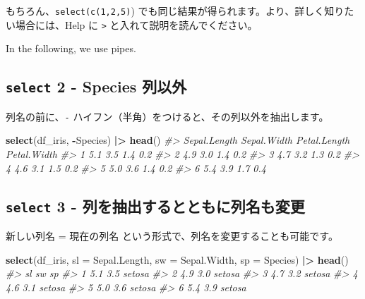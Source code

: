 \documentclass[
  xelatex, ja=standard]{bxjsbook}
\newenvironment{Shaded}{\begin{snugshade}}{\end{snugshade}}
\newcommand{\AttributeTok}[1]{\textcolor[rgb]{0.13,0.29,0.53}{#1}}
\newcommand{\CommentTok}[1]{\textcolor[rgb]{0.56,0.35,0.01}{\textit{#1}}}
\newcommand{\FunctionTok}[1]{\textcolor[rgb]{0.13,0.29,0.53}{\textbf{#1}}}
\newcommand{\NormalTok}[1]{#1}
\newcommand{\SpecialCharTok}[1]{\textcolor[rgb]{0.81,0.36,0.00}{\textbf{#1}}}
\theoremstyle{definition}
\theoremstyle{definition}
\theoremstyle{definition}
\theoremstyle{definition}
\theoremstyle{remark}
\begin{document}
もちろん、\texttt{select(c(1,2,5)}) でも同じ結果が得られます。より、詳しく知りたい場合には、Help に \texttt{\textbar{}\textgreater{}} と入れて説明を読んでください。

In the following, we use pipes.

\hypertarget{select-2---species-ux5217ux4ee5ux5916}{%
\subsection{\texorpdfstring{\texttt{select} 2 - Species 列以外}{select 2 - Species 列以外}}\label{select-2---species-ux5217ux4ee5ux5916}}

列名の前に、\texttt{-} ハイフン（半角）をつけると、その列以外を抽出します。

\begin{Shaded}
\begin{Highlighting}[]
\FunctionTok{select}\NormalTok{(df\_iris, }\SpecialCharTok{{-}}\NormalTok{Species) }\SpecialCharTok{|\textgreater{}} \FunctionTok{head}\NormalTok{()}
\CommentTok{\#\textgreater{}   Sepal.Length Sepal.Width Petal.Length Petal.Width}
\CommentTok{\#\textgreater{} 1          5.1         3.5          1.4         0.2}
\CommentTok{\#\textgreater{} 2          4.9         3.0          1.4         0.2}
\CommentTok{\#\textgreater{} 3          4.7         3.2          1.3         0.2}
\CommentTok{\#\textgreater{} 4          4.6         3.1          1.5         0.2}
\CommentTok{\#\textgreater{} 5          5.0         3.6          1.4         0.2}
\CommentTok{\#\textgreater{} 6          5.4         3.9          1.7         0.4}
\end{Highlighting}
\end{Shaded}

\hypertarget{select-3---ux5217ux3092ux62bdux51faux3059ux308bux3068ux3068ux3082ux306bux5217ux540dux3082ux5909ux66f4}{%
\subsection{\texorpdfstring{\texttt{select} 3 - 列を抽出するとともに列名も変更}{select 3 - 列を抽出するとともに列名も変更}}\label{select-3---ux5217ux3092ux62bdux51faux3059ux308bux3068ux3068ux3082ux306bux5217ux540dux3082ux5909ux66f4}}

新しい列名 = 現在の列名 という形式で、列名を変更することも可能です。

\begin{Shaded}
\begin{Highlighting}[]
\FunctionTok{select}\NormalTok{(df\_iris, }\AttributeTok{sl =}\NormalTok{ Sepal.Length, }\AttributeTok{sw =}\NormalTok{ Sepal.Width, }\AttributeTok{sp =}\NormalTok{ Species) }\SpecialCharTok{|\textgreater{}} 
  \FunctionTok{head}\NormalTok{()}
\CommentTok{\#\textgreater{}    sl  sw     sp}
\CommentTok{\#\textgreater{} 1 5.1 3.5 setosa}
\CommentTok{\#\textgreater{} 2 4.9 3.0 setosa}
\CommentTok{\#\textgreater{} 3 4.7 3.2 setosa}
\CommentTok{\#\textgreater{} 4 4.6 3.1 setosa}
\CommentTok{\#\textgreater{} 5 5.0 3.6 setosa}
\CommentTok{\#\textgreater{} 6 5.4 3.9 setosa}
\end{Highlighting}
\end{Shaded}
\end{document}
